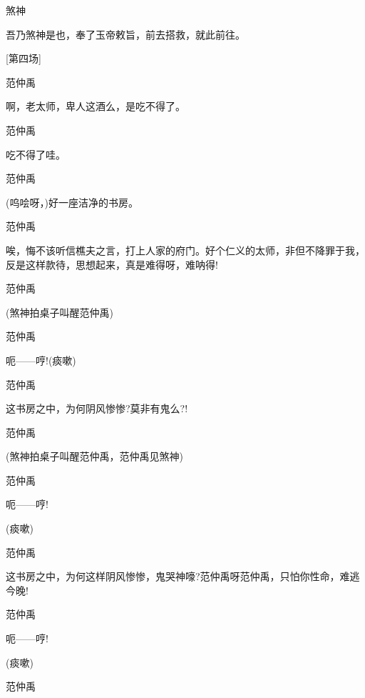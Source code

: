 煞神\hspace{30pt}~

吾乃煞神是也，奉了玉帝敕旨，前去搭救，就此前往。

{{[}第四场{]}}

范仲禹\hspace{20pt}~

啊，老太师，卑人这酒么，是吃不得了。

范仲禹\hspace{20pt}~

吃不得了哇。

范仲禹\hspace{20pt}~

(呜哙呀，)好一座洁净的书房。

范仲禹

唉，悔不该听信樵夫之言，打上人家的府门。好个仁义的太师，非但不降罪于我，反是这样款待，思想起来，真是难得呀，难呐得!

范仲禹


(煞神拍桌子叫醒范仲禹)

范仲禹\hspace{20pt}~

呃------哼!(痰嗽)

范仲禹\hspace{20pt}~

这书房之中，为何阴风惨惨?莫非有鬼么?!

范仲禹


(煞神拍桌子叫醒范仲禹，范仲禹见煞神)

范仲禹\hspace{20pt}~

呃------哼!

(痰嗽)

范仲禹

这书房之中，为何这样阴风惨惨，鬼哭神嚎?范仲禹呀范仲禹，只怕你性命，难逃今晚!

范仲禹\hspace{20pt}~

呃------哼!

(痰嗽)

范仲禹


